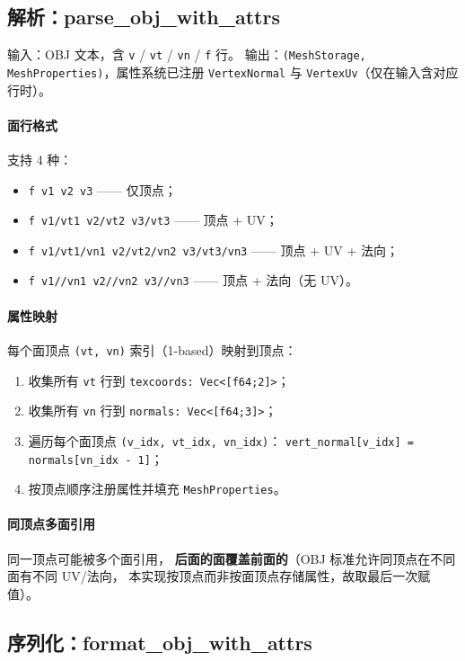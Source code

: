 \documentclass[11pt,a4paper]{article}
\begin{document}
\subsection{解析：parse\_obj\_with\_attrs}

输入：OBJ 文本，含 \texttt{v} / \texttt{vt} / \texttt{vn} / \texttt{f} 行。
输出：\texttt{(MeshStorage, MeshProperties)}，属性系统已注册
\texttt{VertexNormal} 与 \texttt{VertexUv}（仅在输入含对应行时）。

\paragraph{面行格式} 支持 4 种：
\begin{itemize}
  \item \texttt{f v1 v2 v3} —— 仅顶点；
  \item \texttt{f v1/vt1 v2/vt2 v3/vt3} —— 顶点 + UV；
  \item \texttt{f v1/vt1/vn1 v2/vt2/vn2 v3/vt3/vn3} —— 顶点 + UV + 法向；
  \item \texttt{f v1//vn1 v2//vn2 v3//vn3} —— 顶点 + 法向（无 UV）。
\end{itemize}

\paragraph{属性映射} 每个面顶点 \texttt{(vt, vn)} 索引（1-based）映射到顶点：
\begin{enumerate}
  \item 收集所有 \texttt{vt} 行到 \texttt{texcoords: Vec<[f64;2]>}；
  \item 收集所有 \texttt{vn} 行到 \texttt{normals: Vec<[f64;3]>}；
  \item 遍历每个面顶点 {\scriptsize\texttt{(v\_idx, vt\_idx, vn\_idx)}}：
        {\scriptsize\texttt{vert\_normal[v\_idx] = normals[vn\_idx - 1]}}；
  \item 按顶点顺序注册属性并填充 \texttt{MeshProperties}。
\end{enumerate}

\paragraph{同顶点多面引用} 同一顶点可能被多个面引用，
\textbf{后面的面覆盖前面的}（OBJ 标准允许同顶点在不同面有不同 UV/法向，
本实现按顶点而非按面顶点存储属性，故取最后一次赋值）。

\subsection{序列化：format\_obj\_with\_attrs}
\end{document}
